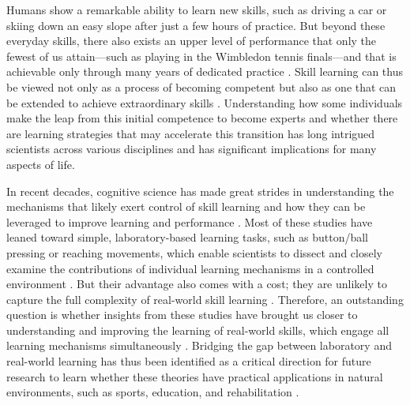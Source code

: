 
Humans show a remarkable ability to learn new skills, such as driving a car or skiing down an easy slope after just a few hours of practice. But beyond these everyday skills, there also exists an upper level of performance that only the fewest of us attain—such as playing in the Wimbledon tennis finals—and that is achievable only through many years of dedicated practice \cite{hodges_predicting_2004, ericsson_role_1993, vaeyens_talent_2009}. Skill learning can thus be viewed not only as a process of becoming competent but also as one that can be extended to achieve extraordinary skills \cite{ericsson_development_2003, ericsson_scientific_1998}. Understanding how some individuals make the leap from this initial competence to become experts and whether there are learning strategies that may accelerate this transition has long intrigued scientists across various disciplines \cite{ericsson_expert_1994, ericsson_scientific_1998, ericsson_development_2003, ericsson_prospects_2002} and has significant implications for many aspects of life.

In recent decades, cognitive science has made great strides in understanding the mechanisms that likely exert control of skill learning and how they can be leveraged to improve learning and performance \cite{wolpert_principles_2011, makino_circuit_2016, spampinato_multiple_2021, krakauer_motor_2019, haith_model-based_2013, huang_rethinking_2011, shmuelof_are_2011, doya_complementary_2000}. Most of these studies have leaned toward simple, laboratory-based learning tasks\cite{krakauer_motor_2019, du_relationship_2022}, such as button/ball pressing \cite{hardwick_time-dependent_2019, vassiliadis_reward_2021} or reaching movements\cite{shadmehr_adaptive_1994, krakauer_learning_2000},  which enable scientists to dissect and closely examine the contributions of individual learning mechanisms in a controlled environment \cite{spampinato_multiple_2021}. But their advantage also comes with a cost; they are unlikely to capture the full complexity of real-world skill learning \cite{krakauer_motor_2019, mangalam_investigating_2023, du_relationship_2022, chen_effects_2018, wolpert_principles_2011, gallivan_decision-making_2018, iyer_probing_2020, ingram_naturalistic_2011}. Therefore, an outstanding question is whether insights from these studies have brought us closer to understanding and improving the learning of real-world skills, which engage all learning mechanisms simultaneously \cite{spampinato_multiple_2021}. Bridging the gap between laboratory and real-world learning has thus been identified as a critical direction for future research to learn whether these theories have practical applications in natural environments, such as sports, education, and rehabilitation \cite{du_relationship_2022, wolpert_motor_2010, yarrow_inside_2009, haar_motor_2020, ingram_naturalistic_2011}.

